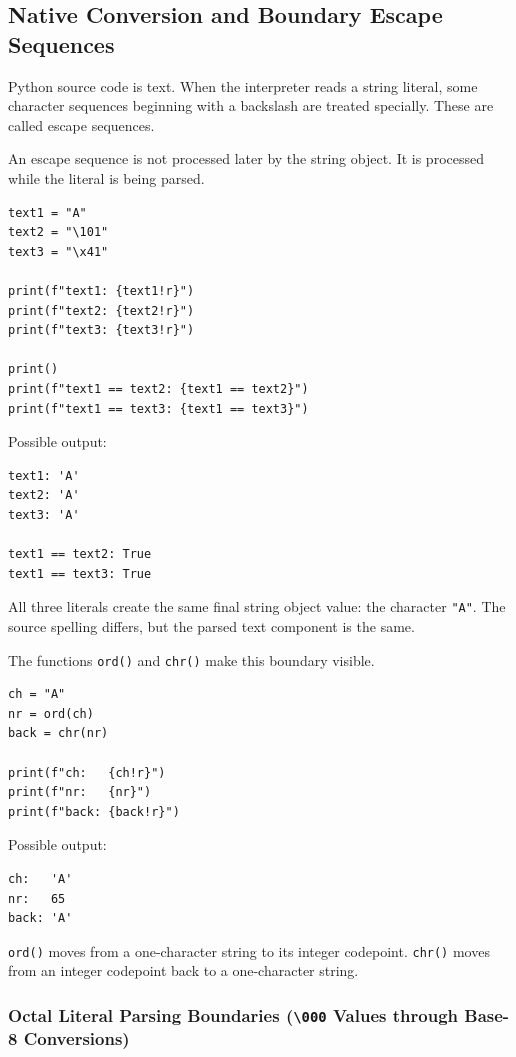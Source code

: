 \subsection{Native Conversion and Boundary Escape Sequences}

Python source code is text. When the interpreter reads a string literal, some character sequences beginning with a backslash are treated specially. These are called escape sequences.

An escape sequence is not processed later by the string object. It is processed while the literal is being parsed.

\begin{verbatim}
text1 = "A"
text2 = "\101"
text3 = "\x41"

print(f"text1: {text1!r}")
print(f"text2: {text2!r}")
print(f"text3: {text3!r}")

print()
print(f"text1 == text2: {text1 == text2}")
print(f"text1 == text3: {text1 == text3}")
\end{verbatim}

Possible output:

\begin{verbatim}
text1: 'A'
text2: 'A'
text3: 'A'

text1 == text2: True
text1 == text3: True
\end{verbatim}

All three literals create the same final string object value: the character \texttt{"A"}. The source spelling differs, but the parsed text component is the same.

The functions \texttt{ord()} and \texttt{chr()} make this boundary visible.

\begin{verbatim}
ch = "A"
nr = ord(ch)
back = chr(nr)

print(f"ch:   {ch!r}")
print(f"nr:   {nr}")
print(f"back: {back!r}")
\end{verbatim}

Possible output:

\begin{verbatim}
ch:   'A'
nr:   65
back: 'A'
\end{verbatim}

\texttt{ord()} moves from a one-character string to its integer codepoint. \texttt{chr()} moves from an integer codepoint back to a one-character string.

\subsubsection{Octal Literal Parsing Boundaries (\texttt{\textbackslash 000} Values through Base-8 Conversions)}

